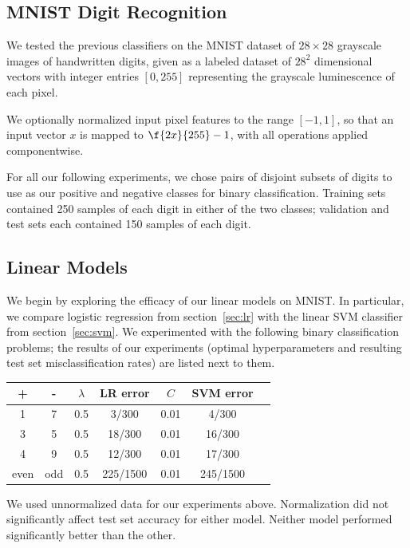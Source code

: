 \documentclass{article}
\begin{document}
\begin{multicols}{2}

\section{MNIST Digit Recognition}

We tested the previous classifiers on the MNIST dataset
of $28\times 28$ grayscale images of handwritten digits,
given as a labeled dataset of $28^2$ dimensional vectors
with integer entries $[0,255]$
representing the grayscale luminescence of each pixel.

We optionally normalized input pixel features to the range $[-1, 1]$,
so that an input vector $x$ is mapped to $\f{2x}{255}-1$,
with all operations applied componentwise.

For all our following experiments,
we chose pairs of disjoint subsets of digits
to use as our positive and negative classes for binary classification.
Training sets contained 250 samples of each digit in either of the two classes;
validation and test sets each contained 150 samples of each digit.

\subsection{Linear Models}

We begin by exploring the efficacy of our linear models on MNIST.
In particular, we compare logistic regression from section~\ref{sec:lr}
with the linear SVM classifier from section~\ref{sec:svm}.
We experimented with the following binary classification problems;
the results of our experiments
(optimal hyperparameters and resulting test set misclassification rates)
are listed next to them.
\begin{center}
\begin{tabular}{|c|c||c|c||c|c|c|}
\hline
+ & - & $\lambda$ & LR error & $C$ & SVM error \\\hline
1 & 7 & 0.5 & 3/300 & 0.01 & 4/300 \\
3 & 5 & 0.5 & 18/300 & 0.01 & 16/300 \\
4 & 9 & 0.5 & 12/300 & 0.01 & 17/300\\
even & odd & 0.5 & 225/1500 & 0.01 & 245/1500\\\hline
\end{tabular}
\end{center}
We used unnormalized data for our experiments above.
Normalization did not significantly affect test set accuracy
for either model.
Neither model performed significantly better than the other.


\end{multicols}
\end{document}
